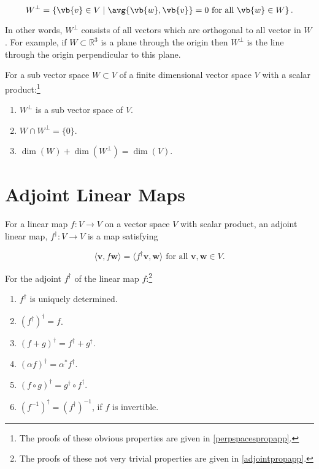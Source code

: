 \documentclass[a4paper,12pt]{report}
\begin{document}
\begin{equation}
    W^{\perp } = \left\{\vb{v} \in V \mid \avg{\vb{w} ,\vb{v} }= 0 \text{ for all } \vb{w} \in W \right\}.
\end{equation}

In other words, \(W^{\perp } \) consists of all vectors which are orthogonal to all vector in \(W\). For example, if \(W \subset \mathbb{R}^3 \) is a plane through the origin then \(W^{\perp } \)  is the line through the origin perpendicular to this plane.   

\begin{lemma} \label{perpspacesprop} 

For a sub vector space \(W \subset V\) of a finite dimensional vector space \(V\) with a scalar product:\footnote{The proofs of these obvious properties are given in \cref{perpspacespropapp}.} 
\begin{enumerate}[label=(\(L\)\arabic*)]
    \item \(W^\perp\) is a sub vector space of \(V\).
    \item \(W \cap W^\perp = \{0\}\).
    \item \(\dim(W) + \dim(W^\perp) = \dim(V)\).
\end{enumerate}
\end{lemma}

\section{Adjoint Linear Maps}

\begin{definition}
For a linear map \(f : V \to V\) on a vector space \(V\) with scalar product, an adjoint linear map, \(f^\dagger : V \to V\) is a map satisfying
    
    \begin{equation}
    \langle \mathbf{v}, f \mathbf{w} \rangle = \langle f^\dagger \mathbf{v}, \mathbf{w} \rangle \text{ for all } \mathbf{v}, \mathbf{w} \in V.
    \end{equation}

\end{definition}
    
\begin{lemma} \label{adjointprop} 
    For the adjoint \(f^{\dagger} \) of the linear map \(f\):\footnote{The proofs of these not very trivial properties are given in \cref{adjointpropapp}.} 
    \begin{enumerate}[label=(\(M\)\arabic*)]
        \item \(f^\dagger\) is uniquely determined.
        \item \((f^\dagger)^\dagger = f\).
        \item \((f+g)^\dagger = f^\dagger + g^\dagger\).
        \item \((\alpha f)^\dagger = \alpha^* f^\dagger\).
        \item \((f \circ g)^\dagger = g^\dagger \circ f^\dagger\).
        \item \((f^{-1})^\dagger = (f^\dagger)^{-1}\), if \(f\) is invertible.
    \end{enumerate}
\end{lemma}
\end{document}
